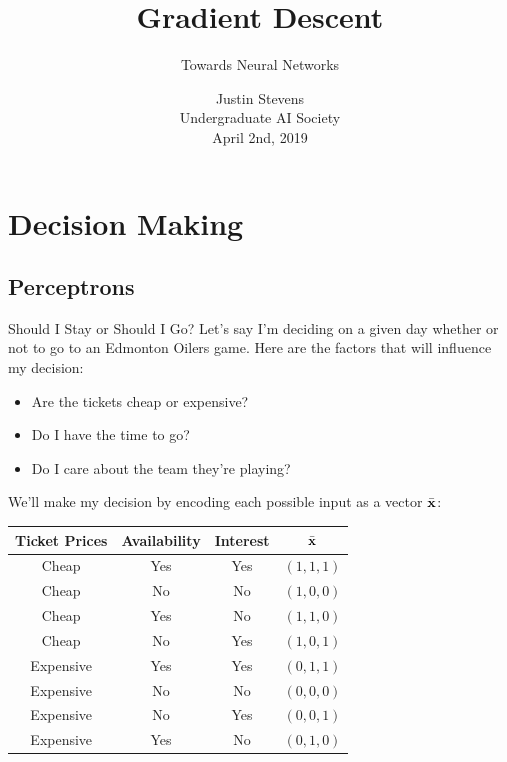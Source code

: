 \documentclass[xcolor=dvipsnames, fontsize=11pt, %
pagesize, %
parskip=half-, t]{beamer}
\title[Artificial Intelligence for Beginners]{Gradient Descent}
\subtitle{Towards Neural Networks}
\author[Justin Stevens]{\large Justin Stevens \\ \large Undergraduate AI Society \\  April 2nd, 2019} %
\date{}
\begin{document}
	\renewcommand{\thefootnote}{\fnsymbol{footnote}}
	\begin{frame}[c]
	\centering
	\titlepage
\end{frame}
\section{Decision Making}
\subsection{Perceptrons}
\begin{frame}{Should I Stay or Should I Go?}
Let's say I'm deciding on a given day whether or not to go to  an Edmonton Oilers game. Here are the factors that will influence my decision: \pause 
\begin{itemize}
\item Are the tickets cheap or expensive?
\item Do I have the time to go?
\item Do I care about the team they're playing?
\end{itemize} \pause 
We'll make my decision by encoding each possible input as a vector $\bar{\bold{x}}$: \pause
\begin{table} \center 
\begin{tabular}{ccc|c}
Ticket Prices & Availability & Interest & $\bar{\bold{x}}$\\ \hline 
Cheap & Yes & Yes & $(1,1,1)$ \\
Cheap & No & No & $(1,0,0)$ \\
Cheap & Yes & No & $(1,1,0)$ \\
Cheap & No & Yes & $(1,0,1)$  \\
Expensive & Yes & Yes & $(0,1,1)$ \\
Expensive & No & No & $(0,0,0)$ \\
Expensive & No & Yes & $(0,0,1)$ \\
Expensive & Yes & No & $(0,1,0)$ 
\end{tabular}
\end{table}
\end{frame}
\end{document}
